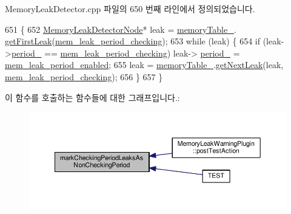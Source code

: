 Memory\+Leak\+Detector.\+cpp 파일의 650 번째 라인에서 정의되었습니다.


\begin{DoxyCode}
651 \{
652     \hyperlink{struct_memory_leak_detector_node}{MemoryLeakDetectorNode}* leak = \hyperlink{class_memory_leak_detector_abee17cabbc59ef23d6f51027208a100c}{memoryTable\_}.
      \hyperlink{struct_memory_leak_detector_table_a1b95cd1a5e8372a8f795f2d3387ae065}{getFirstLeak}(\hyperlink{_memory_leak_detector_8h_ab248e6cc6c6699b88b002286d8a3ed76ad140291a5b8a535af47f9858220f2639}{mem\_leak\_period\_checking});
653     \textcolor{keywordflow}{while} (leak) \{
654         \textcolor{keywordflow}{if} (leak->\hyperlink{struct_memory_leak_detector_node_a4b296dc99cd64623a83ce9027f70e0e7}{period\_} == \hyperlink{_memory_leak_detector_8h_ab248e6cc6c6699b88b002286d8a3ed76ad140291a5b8a535af47f9858220f2639}{mem\_leak\_period\_checking}) leak->
      \hyperlink{struct_memory_leak_detector_node_a4b296dc99cd64623a83ce9027f70e0e7}{period\_} = \hyperlink{_memory_leak_detector_8h_ab248e6cc6c6699b88b002286d8a3ed76af44afdfdc843b0c299b8b0a9585a0f32}{mem\_leak\_period\_enabled};
655         leak = \hyperlink{class_memory_leak_detector_abee17cabbc59ef23d6f51027208a100c}{memoryTable\_}.\hyperlink{struct_memory_leak_detector_table_a4aafc8945d8152ee287b651ffd2ede97}{getNextLeak}(leak, 
      \hyperlink{_memory_leak_detector_8h_ab248e6cc6c6699b88b002286d8a3ed76ad140291a5b8a535af47f9858220f2639}{mem\_leak\_period\_checking});
656     \}
657 \}
\end{DoxyCode}


이 함수를 호출하는 함수들에 대한 그래프입니다.\+:
\nopagebreak
\begin{figure}[H]
\begin{center}
\leavevmode
\includegraphics[width=350pt]{class_memory_leak_detector_a6db202697cf20e8d84748b129c403545_icgraph}
\end{center}
\end{figure}


